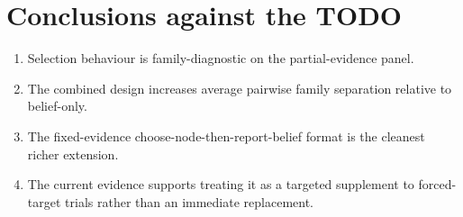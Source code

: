 \documentclass[11pt,a4paper]{article}
\begin{document}
\section{Conclusions against the TODO}
\begin{enumerate}
    \item Selection behaviour is family-diagnostic on the partial-evidence panel.
    \item The combined design increases average pairwise family separation relative to belief-only.
    \item The fixed-evidence choose-node-then-report-belief format is the cleanest richer extension.
    \item The current evidence supports treating it as a targeted supplement to forced-target trials rather than an immediate replacement.
\end{enumerate}



\end{document}
